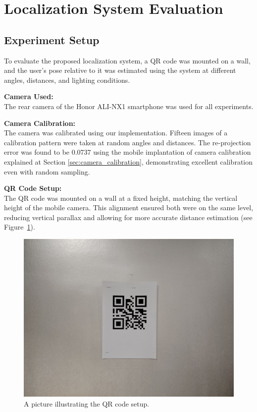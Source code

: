 \section{Localization System Evaluation}

\subsection{Experiment Setup}

To evaluate the proposed localization system, a QR code was mounted on a wall, and the user's pose relative to it was estimated using the system at different angles, distances, and lighting conditions.

\textbf{Camera Used:}\\
The rear camera of the Honor ALI-NX1 smartphone was used for all experiments.

\textbf{Camera Calibration:}\\
The camera was calibrated using our implementation. Fifteen images of a calibration pattern were taken at random angles and distances. The re-projection error was found to be 0.0737 using the mobile implantation of camera calibration explained at Section \ref{sec:camera_calibration}, demonstrating excellent calibration even with random sampling.

\textbf{QR Code Setup:}\\
The QR code was mounted on a wall at a fixed height, matching the vertical height of the mobile camera. This alignment ensured both were on the same level, reducing vertical parallax and allowing for more accurate distance estimation (see Figure~\ref{Localization-Experiment-QR-Setup}).



\begin{figure}[h!]
	\centering
	\includegraphics[width=0.7\linewidth]{assets/ch4/QR on a wall.jpg}
	\caption{A picture illustrating the QR code setup.}
	\label{Localization-Experiment-QR-Setup}
\end{figure}

